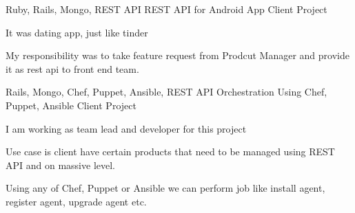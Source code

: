 

\begin{cventries}


  \cventry
    {Ruby, Rails, Mongo, REST API} %
    {REST API for Android App} %
    {Client Project} %
    {} %
    {
      \begin{cvitems} %
        \item {It was dating app, just like tinder}
        \item {My responsibility was to take feature request from Prodcut Manager and provide it as rest api to front end team.}
      \end{cvitems}
    }

  \cventry
    {Rails, Mongo, Chef, Puppet, Ansible, REST API} %
    {Orchestration Using Chef, Puppet, Ansible} %
    {Client Project} %
    {} %
    {
      \begin{cvitems} %
        \item {I am working as team lead and developer for this project}
        \item {Use case is client have certain products that need to be managed using REST API and on massive level.}
        \item {Using any of Chef, Puppet or Ansible we can perform job like install agent, register agent, upgrade agent etc.}
      \end{cvitems}
    }


\end{cventries}
